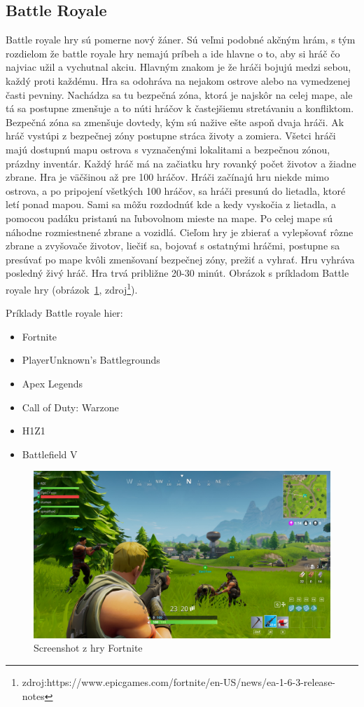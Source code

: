 \documentclass[10pt,oneside,slovak,a4paper]{article}
\begin{document}
\subsection{Battle Royale} \label{zanre:battleroyale}

Battle royale hry sú pomerne nový žáner. Sú veľmi podobné akčným hrám, s tým rozdielom že battle royale hry nemajú príbeh a ide hlavne o to, aby si hráč čo najviac užil a vychutnal akciu. Hlavným znakom je že hráči bojujú medzi sebou, každý proti každému. Hra sa odohráva na nejakom ostrove alebo na vymedzenej časti pevniny. Nachádza sa tu bezpečná zóna, ktorá je najskôr na celej mape, ale tá sa postupne zmenšuje a to núti hráčov k častejšiemu stretávaniu a konfliktom. Bezpečná zóna sa zmenšuje dovtedy, kým sú nažive ešte aspoň dvaja hráči. Ak hráč vystúpi z bezpečnej zóny postupne stráca životy a zomiera. Všetci hráči majú dostupnú mapu ostrova s vyznačenými lokalitami a bezpečnou zónou, prázdny inventár. Každý hráč má na začiatku hry rovanký počet životov a žiadne zbrane. Hra je väčšinou až pre 100 hráčov. Hráči začínajú hru niekde mimo ostrova, a po pripojení všetkých 100 hráčov, sa hráči presunú do lietadla, ktoré letí ponad mapou. Sami sa môžu rozdodnúť kde a kedy vyskočia z lietadla, a pomocou padáku pristanú na ľubovolnom mieste na mape. Po celej mape sú náhodne rozmiestnené zbrane a vozidlá. Cieľom hry je zbierať a vylepšovať rôzne zbrane a zvyšovače životov, liečiť sa, bojovať s ostatnými hráčmi, postupne sa presúvať po mape kvôli zmenšovaní bezpečnej zóny, prežiť a vyhrať. Hru vyhráva posledný živý hráč. Hra trvá približne 20-30 minút. Obrázok s príkladom Battle royale hry (obrázok~\ref{f:fortnite}, zdroj\footnote{zdroj:https://www.epicgames.com/fortnite/en-US/news/ea-1-6-3-release-notes}).

Príklady Battle royale hier:
\begin{itemize}
\item Fortnite
\item PlayerUnknown's Battlegrounds
\item Apex Legends
\item Call of Duty: Warzone
\item H1Z1
\item Battlefield V
\end{itemize}

\begin{figure}[h]
\centering
\includegraphics[scale=0.10]{fortnite.jpg}
\caption{Screenshot z hry Fortnite}
\label{f:fortnite}
\end{figure}
\end{document}
